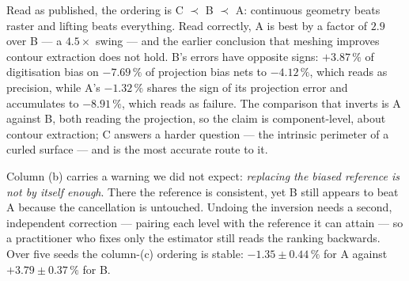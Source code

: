 \documentclass{article}
\newcommand{\pct}[1]{$#1\,\%$}
\begin{document}
Read as published, the ordering is C $\prec$ B $\prec$ A: continuous geometry beats raster and
lifting beats everything. Read correctly, A is best by a factor of $2.9$ over B --- a $4.5\times$
swing --- and the earlier conclusion that meshing improves contour extraction does not hold. B's
errors have opposite signs: \pct{+3.87} of digitisation bias on \pct{-7.69} of projection bias
nets to \pct{-4.12}, which reads as precision, while A's \pct{-1.32} shares the sign of its
projection error and accumulates to \pct{-8.91}, which reads as failure. The comparison that
inverts is A against B, both reading the projection, so the claim is component-level, about contour
extraction; C answers a harder question --- the intrinsic perimeter of a curled surface --- and is
the most accurate route to it.

Column (b) carries a warning we did not expect: \emph{replacing the biased reference is not by
itself enough}. There the reference is consistent, yet B still appears to beat A because the
cancellation is untouched. Undoing the inversion needs a second, independent correction ---
pairing each level with the reference it can attain --- so a practitioner who fixes only the
estimator still reads the ranking backwards. Over five seeds the column-(c) ordering is stable:
$-1.35 \pm 0.44\,\%$ for A against $+3.79 \pm 0.37\,\%$ for B.
\end{document}
